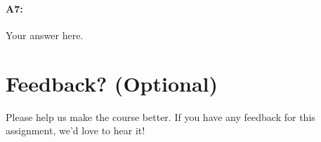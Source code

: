 \paragraph{A7:} Your answer here.









\pagebreak
\section*{Feedback? (Optional)}
Please help us make the course better. If you have any feedback for this assignment, we'd love to hear it!



